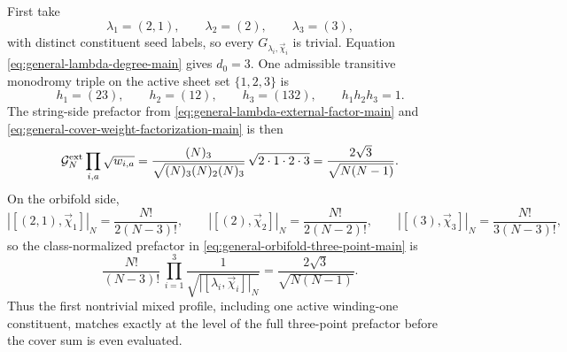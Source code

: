 \documentclass[11pt]{article}
\newcommand{\mc}[1]{\mathcal{#1}}
\begin{document}
First take
\begin{equation}\label{eq:mixed-profile-example-data}
\lambda_1=(2,1),
\qquad
\lambda_2=(2),
\qquad
\lambda_3=(3),
\end{equation}
with distinct constituent seed labels, so every $G_{\lambda_i,\vec\chi_i}$ is trivial. Equation \eqref{eq:general-lambda-degree-main} gives $d_0=3$. One admissible transitive monodromy triple on the active sheet set $\{1,2,3\}$ is
\begin{equation}\label{eq:mixed-profile-example-monodromy}
h_1=(23),
\qquad
h_2=(12),
\qquad
h_3=(132),
\qquad
h_1h_2h_3=1.
\end{equation}
The string-side prefactor from \eqref{eq:general-lambda-external-factor-main} and \eqref{eq:general-cover-weight-factorization-main} is then
\begin{equation}\label{eq:mixed-profile-example-string-factor}
\mc G_N^{\rm ext}\prod_{i,a}\sqrt{w_{i,a}}
=
\frac{(N)_3}{\sqrt{(N)_3(N)_2(N)_3}}\,
\sqrt{2\cdot 1\cdot 2\cdot 3}
=
\frac{2\sqrt{3}}{\sqrt{N(N-1)}}.
\end{equation}
On the orbifold side,
\[
|[(2,1),\vec\chi_1]|_N=\frac{N!}{2(N-3)!},
\qquad
|[(2),\vec\chi_2]|_N=\frac{N!}{2(N-2)!},
\qquad
|[(3),\vec\chi_3]|_N=\frac{N!}{3(N-3)!},
\]
so the class-normalized prefactor in \eqref{eq:general-orbifold-three-point-main} is
\begin{equation}\label{eq:mixed-profile-example-orbifold-factor}
\frac{N!}{(N-3)!}\,
\prod_{i=1}^3 \frac{1}{\sqrt{|[\lambda_i,\vec\chi_i]|_N}}
=
\frac{2\sqrt{3}}{\sqrt{N(N-1)}}.
\end{equation}
Thus the first nontrivial mixed profile, including one active winding-one constituent, matches exactly at the level of the full three-point prefactor before the cover sum is even evaluated.
\end{document}
